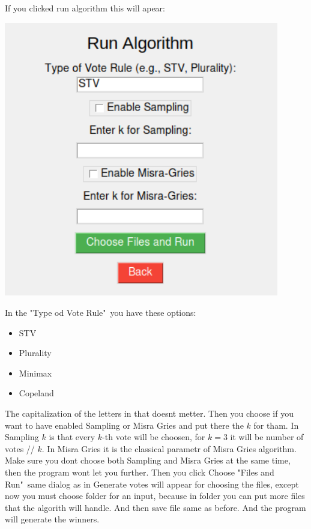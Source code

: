 \documentclass[a4paper,12pt]{report}
\begin{document}
	If you clicked run algorithm this will apear:
	
	\begin{center}
		\includegraphics[width=12cm]{run_algorithm.png}
	\end{center}
	
	In the "Type od Vote Rule"\ you have these options:
	
	\begin{itemize}
		\item STV
		\item Plurality
		\item Minimax
		\item Copeland
	\end{itemize}
	
	The capitalization of the letters in that doesnt metter. Then you choose if you want to have enabled Sampling or Misra Gries and put there the $k$ for tham. In Sampling $k$ is that every $k$-th vote will be choosen, for $k = 3$ it will be number of votes // $k$. In Misra Gries it is the classical parametr of Misra Gries algorithm. Make sure you dont choose both Sampling and Misra Gries at the same time, then the program wont let you further. Then you click Choose "Files and Run"\ same dialog as in Generate votes will appear for choosing the files, except now you must choose folder for an input, because in folder you can put more files that the algorith will handle. And then save file same as before. And the program will generate the winners.
	
\end{document}

